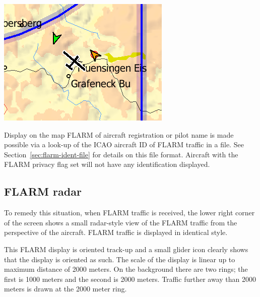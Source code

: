 \documentclass[a4paper,12pt]{refrep}
\begin{document}
\begin{center}
\includegraphics[angle=0,width=0.4\linewidth,keepaspectratio='true']{figures/flarmmap.png}
\end{center}

Display on the map FLARM of aircraft registration or pilot name is
made possible via a look-up of the ICAO aircraft ID of FLARM traffic
in a file.  See Section~\ref{sec:flarm-ident-file} for details on this
file format.  Aircraft with the FLARM privacy flag set will not have
any identification displayed.

\subsection*{FLARM radar}

To remedy this situation, when FLARM traffic is received, the lower
right corner of the screen shows a small radar-style view of the FLARM
traffic from the perspective of the aircraft.  FLARM traffic is
displayed in identical style.

This FLARM display is oriented track-up and a small glider icon
clearly shows that the display is oriented as such.  The scale of the
display is linear up to maximum distance of 2000 meters.  On the
background there are two rings; the first is 1000 meters and the second 
is 2000 meters.  Traffic further away than 2000 meters is drawn at the 2000 meter ring.
\end{document}
